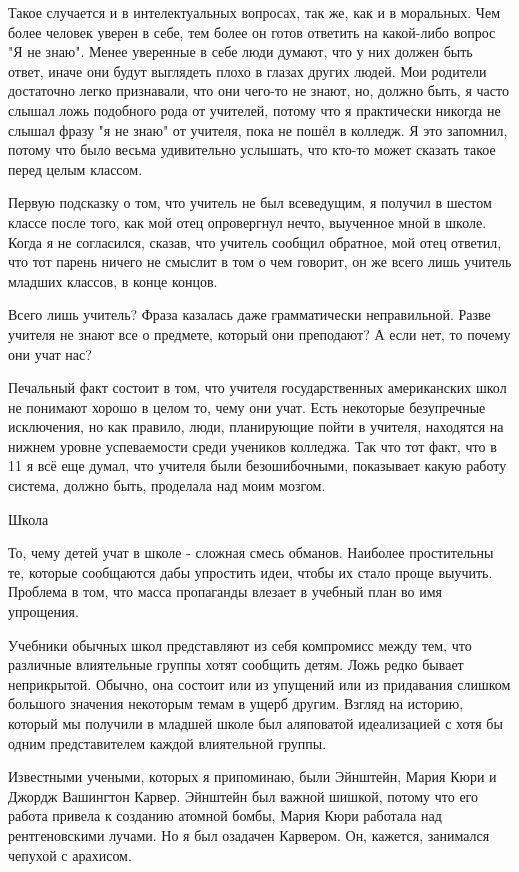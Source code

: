 \documentclass[ebook,12pt,oneside,openany]{memoir}
\begin{document}
Такое случается и в интелектуальных вопросах, так же, как и в
моральных. Чем более человек уверен в себе, тем более он готов
ответить на какой-либо вопрос "Я не знаю". Менее уверенные в себе люди
думают, что у них должен быть ответ, иначе они будут выглядеть плохо в
глазах других людей. Мои родители достаточно легко признавали, что они
чего-то не знают, но, должно быть, я часто слышал ложь подобного рода
от учителей, потому что я практически никогда не слышал фразу "я не
знаю" от учителя, пока не пошёл в колледж. Я это запомнил, потому что
было весьма удивительно услышать, что кто-то может сказать такое перед
целым классом.

Первую подсказку о том, что учитель не был всеведущим, я получил в
шестом классе после того, как мой отец опровергнул нечто, выученное
мной в школе. Когда я не согласился, сказав, что учитель сообщил
обратное, мой отец ответил, что тот парень ничего не смыслит в том о
чем говорит, он же всего лишь учитель младших классов, в конце концов.

Всего лишь учитель? Фраза казалась даже грамматически неправильной.
Разве учителя не знают все о предмете, который они преподают? А если
нет, то почему они учат нас?

Печальный факт состоит в том, что учителя государственных американских
школ не понимают хорошо в целом то, чему они учат. Есть некоторые
безупречные исключения, но как правило, люди, планирующие пойти в
учителя, находятся на нижнем уровне успеваемости среди учеников
колледжа. Так что тот факт, что в 11 я всё еще думал, что учителя были
безошибочными, показывает какую работу система, должно быть, проделала
над моим мозгом.

Школа

То, чему детей учат в школе - сложная смесь обманов. Наиболее
простительны те, которые сообщаются дабы упростить идеи, чтобы их
стало проще выучить. Проблема в том, что масса пропаганды влезает в
учебный план во имя упрощения.

Учебники обычных школ представляют из себя компромисс между тем, что
различные влиятельные группы хотят сообщить детям. Ложь редко бывает
неприкрытой. Обычно, она состоит или из упущений или из придавания
слишком большого значения некоторым темам в ущерб другим. Взгляд на
историю, который мы получили в младшей школе был аляповатой
идеализацией с хотя бы одним представителем каждой влиятельной группы.

Известными учеными, которых я припоминаю, были Эйнштейн, Мария Кюри и
Джордж Вашингтон Карвер. Эйнштейн был важной шишкой, потому что его
работа привела к созданию атомной бомбы, Мария Кюри работала над
рентгеновскими лучами. Но я был озадачен Карвером. Он, кажется,
занимался чепухой с арахисом.
\end{document}
